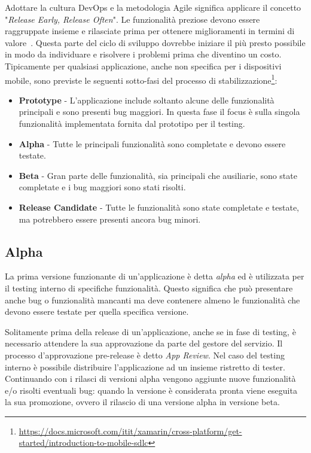 Adottare la cultura DevOps e la metodologia Agile significa applicare il concetto "\textit{Release Early, Release Often}". 
Le funzionalità preziose devono essere raggruppate insieme e rilasciate prima per ottenere miglioramenti in termini di valore~\cite{shore2008art}. 
Questa parte del ciclo di sviluppo dovrebbe iniziare il più presto possibile in modo da individuare e risolvere i problemi prima che diventino un costo. 
Tipicamente per qualsiasi applicazione, 
anche non specifica per i dispositivi mobile, 
sono previste le seguenti sotto-fasi del processo di stabilizzazione\footnote{\href{https://docs.microsoft.com/itit/xamarin/cross-platform/get-started/introduction-to-mobile-sdlc}{https://docs.microsoft.com/itit/xamarin/cross-platform/get-started/introduction-to-mobile-sdlc}}:

\begin{itemize}
    \item \textbf{Prototype} - L'applicazione include soltanto alcune delle funzionalità principali e sono presenti bug maggiori. In questa fase il focus è sulla singola funzionalità implementata fornita dal prototipo per il testing.
    
    \item \textbf{Alpha} - Tutte le principali funzionalità sono completate e devono essere testate.
    
    \item \textbf{Beta} - Gran parte delle funzionalità, sia principali che ausiliarie, sono state completate e i bug maggiori sono stati risolti.
    
    \item \textbf{Release Candidate} - Tutte le funzionalità sono state completate e testate, ma potrebbero essere presenti ancora bug minori.
\end{itemize}

\subsection{Alpha}
La prima versione funzionante di un'applicazione è detta \textit{alpha} ed è utilizzata per il testing interno di specifiche funzionalità.
Questo significa che può presentare anche bug o funzionalità mancanti ma deve contenere almeno le funzionalità che devono essere testate per quella specifica versione.

Solitamente prima della release di un'applicazione, 
anche se in fase di testing, 
è necessario attendere la sua approvazione da parte del gestore del servizio. 
Il processo d'approvazione pre-release è detto \textit{App Review}. 
Nel caso del testing interno è possibile distribuire l'applicazione ad un insieme ristretto di tester. 
Continuando con i rilasci di versioni alpha vengono aggiunte nuove funzionalità e/o risolti eventuali bug: 
quando la versione è considerata pronta viene eseguita la sua promozione, 
ovvero il rilascio di una versione alpha in versione beta.

